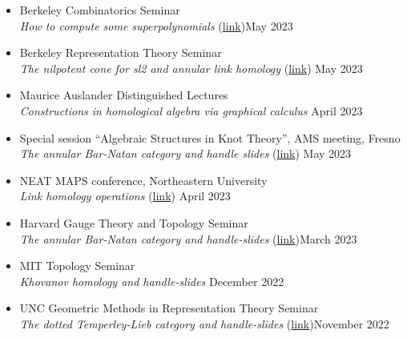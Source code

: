 \documentclass[12pt]{amsart}
\renewcommand{\j}{\indent}
\begin{document}
\begin{itemize}
\item[$\cdot$] Berkeley Combinatorics Seminar \\ \j \emph{How to compute some superpolynomials} (\href{https://events.berkeley.edu/math/event/197125-combinatorics-seminar-how-to-compute-some}{link})\hfill May 2023

\item[$\cdot$] Berkeley Representation Theory Seminar \\
\j\emph{The nilpotent cone for sl2 and annular link homology} (\href{https://math.berkeley.edu/~sashau/spring23-tenscat}{link}) \hfill May 2023

\item[$\cdot$] Maurice Auslander Distinguished Lectures \\ \j
\emph{Constructions in homological algebra via graphical calculus} \hfill  April 2023

\item[$\cdot$] Special session ``Algebraic Structures in Knot Theory'', AMS meeting, Fresno \\ \j 
\emph{The annular Bar-Natan category and handle slides} (\href{https://www.ams.org/meetings/sectional/2293_special.html}{link}) \hfill May 2023 

\item[$\cdot$] NEAT MAPS conference, Northeastern University \\ \j
\emph{Link homology operations} (\href{https://brianrwilliams.github.io/neatmaps/NEATMAPS_2023_Abstracts.pdf}{link}) \hfill April 2023

\item[$\cdot$] Harvard Gauge Theory and Topology Seminar
\\ \j\emph{The annular Bar-Natan category and handle-slides} (\href{The annular Bar-Natan category and handle-slides
https://www.math.harvard.edu/event/the-annular-bar-natan-category-and-handle-slides/}{link})\hfill March 2023

\item[$\cdot$] MIT Topology Seminar \\ \j \emph{Khovanov homology and handle-slides} \hfill December 2022

\item[$\cdot$] UNC Geometric Methods in Representation Theory Seminar \\ \j \emph{The dotted Temperley-Lieb category and handle-slides} (\href{https://math.unc.edu/event/dr-matt-hogancamp-northeastern-tba/}{link})\hfill November 2022


\end{itemize}
\end{document}
